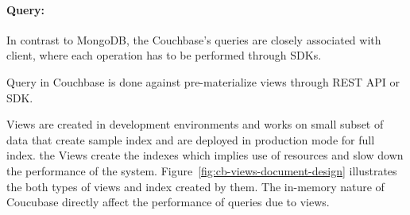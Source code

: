 \paragraph{Query:}
 In contrast to MongoDB,  the Couchbase's queries are closely associated with client,  where each operation has to be performed through SDKs.
\par
Query in Couchbase is done against pre-materialize views through REST API or SDK. 
\par 
Views are created in development environments and works on small subset of data that create sample index and are deployed in production mode for full index. the Views create the indexes which implies use of resources and slow down the performance of the system. Figure~\ref{fig:cb-views-document-design} illustrates the both types of views and index created by them. The in-memory nature of Coucubase directly affect the performance of queries due to views.
	
 
 
 
 
 
 
 
 
 
 
 
 
 
 
 
 
 
 
 
 
 
 

	